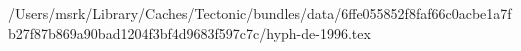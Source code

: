 /Users/msrk/Library/Caches/Tectonic/bundles/data/6ffe055852f8faf66c0acbe1a7fb27f87b869a90bad1204f3bf4d9683f597c7c/hyph-de-1996.tex